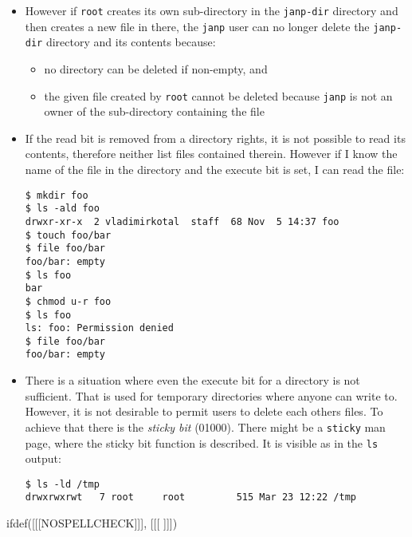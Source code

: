 \begin{itemize}
\item However if \texttt{root} creates its own sub-directory in the
\texttt{janp-dir} directory and then creates a new file in there, the
\texttt{janp} user can no longer delete the \texttt{janp-dir} directory and its
contents because:
\begin{itemize}
\item no directory can be deleted if non-empty, and
\item the given file created by \texttt{root} cannot be deleted because
\texttt{janp} is not an owner of the sub-directory containing the file
\end{itemize}
\item If the read bit is removed from a directory rights, it is not possible to
read its contents, therefore neither list files contained therein. However if I
know the name of the file in the directory and the execute bit is set, I can
read the file:
\begin{verbatim}
$ mkdir foo
$ ls -ald foo
drwxr-xr-x  2 vladimirkotal  staff  68 Nov  5 14:37 foo
$ touch foo/bar
$ file foo/bar
foo/bar: empty
$ ls foo
bar
$ chmod u-r foo
$ ls foo
ls: foo: Permission denied
$ file foo/bar
foo/bar: empty
\end{verbatim}
\item There is a situation where even the execute bit for a directory is not
sufficient.  That is used for temporary directories where anyone can write to.
However, it is not desirable to permit users to delete each others files.
To achieve that there is the \emph{sticky bit} (01000).  There might be a
\texttt{sticky} man page, where the sticky bit function is described.
It is visible as \texttt{} in the \texttt{ls} output:

\begin{verbatim}
$ ls -ld /tmp
drwxrwxrwt   7 root     root         515 Mar 23 12:22 /tmp
\end{verbatim}
\end{itemize}


ifdef([[[NOSPELLCHECK]]], [[[
]]])

